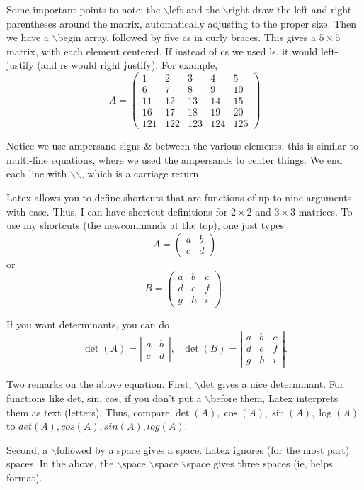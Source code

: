 \documentclass[12pt,reqno]{amsart}
\newcommand{\mattwo}[4]
{\left(\begin{array}{cc}
                        #1  & #2   \\
                        #3 &  #4
                          \end{array}\right) }
\newcommand{\matthree}[9]
{\left(\begin{array}{ccc}
                        #1  & #2 & #3  \\
                        #4 &  #5 & #6 \\
                        #7 &  #8 & #9
                          \end{array}\right) }
\newcommand{\dettwo}[4]
{\left|\begin{array}{cc}
                        #1  & #2   \\
                        #3 &  #4
                          \end{array}\right| }
\newcommand{\detthree}[9]
{\left|\begin{array}{ccc}
                        #1  & #2 & #3  \\
                        #4 &  #5 & #6 \\
                        #7 &  #8 & #9
                          \end{array}\right| }
\numberwithin{equation}{section}
\begin{document}
Some important points to note: the $\backslash$left and the
$\backslash$right draw the left and right parentheses around the
matrix, automatically adjusting to the proper size. Then we have a
$\backslash$begin array, followed by five cs in curly braces. This
gives a $5 \times 5$ matrix, with each element centered. If
instead of cs we used ls, it would left-justify (and rs would
right justify). For example,
\begin{equation}
A =  \left( \begin{array}{rrrrr}
                        1  & 2  & 3  & 4  & 5  \\
                        6  & 7  & 8  & 9  & 10 \\
                        11 & 12 & 13 & 14 & 15 \\
                        16 & 17 & 18 & 19 & 20 \\
                        121 & 122 & 123 & 124 & 125
                          \end{array}\right)
\end{equation}

Notice we use ampersand signs \& between the various elements;
this is similar to multi-line equations, where we used the
ampersands to center things. We end each line with
$\backslash$$\backslash$, which is a carriage return.

Latex allows you to define shortcuts that are functions of up to
nine arguments with ease. Thus, I can have shortcut definitions
for $2 \times 2$ and $3 \times 3$ matrices. To use my shortcuts
(the newcommands at the top), one just types
\begin{equation}
A = \mattwo{a}{b}{c}{d}
\end{equation}
or
\begin{equation}
B = \matthree{a}{b}{c}{d}{e}{f}{g}{h}{i}.
\end{equation}

If you want determinants, you can do
\begin{equation}
\det(A) = \dettwo{a}{b}{c}{d}, \ \ \ \det(B) =
\detthree{a}{b}{c}{d}{e}{f}{g}{h}{i}.
\end{equation}

Two remarks on the above equation. First, $\backslash$det gives a
nice determinant. For functions like det, sin, cos, if you don't
put a $\backslash$before them, Latex interprets them as text
(letters). Thus, compare $\det(A), \cos(A), \sin(A), \log(A)$ to
$det(A), cos(A), sin(A), log(A)$.

Second, a $\backslash$followed by a space gives a space. Latex
ignores (for the most part) spaces. In the above, the
$\backslash$space $\backslash$space $\backslash$space gives three
spaces (ie, helps format).
\end{document}
